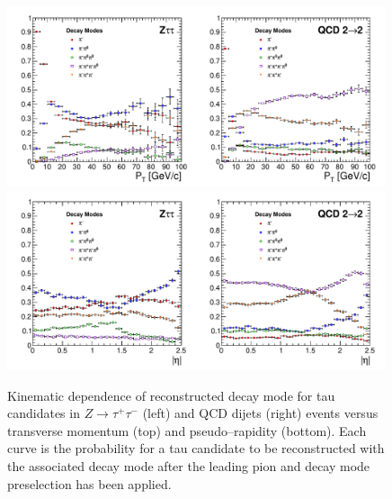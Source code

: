 \begin{figure}[thbp]
   \setlength{\unitlength}{1mm}
   \begin{center}
     \includegraphics*[width=0.99\textwidth]{tanc_chapter/figures/dmVsPt.pdf}
     \includegraphics*[width=0.99\textwidth]{tanc_chapter/figures/dmVsEta.pdf}
   \caption[Kinematic dependence of decay mode reconstruction]{Kinematic
   dependence of reconstructed decay mode for tau candidates in 
   \mbox{$Z\to\tau^{+}\tau^{-}$} (left) and QCD dijets (right) events versus
   transverse momentum (top) and pseudo--rapidity (bottom).  Each curve is the
   probability for a tau candidate to be reconstructed with the associated
   decay mode after the leading pion and decay mode preselection has been
   applied.  } \label{fig:dmKinematics}
   \end{center}
\end{figure}
